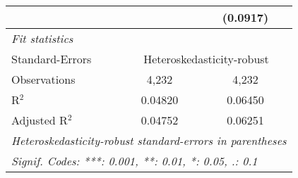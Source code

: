 \begin{tabular}{lcc}
                                         &                 & (0.0917)\\   
   \midrule
   \emph{Fit statistics}\\
   Standard-Errors & \multicolumn{2}{c}{Heteroskedasticity-robust} \\ 
   Observations                          & 4,232           & 4,232\\  
   R$^2$                                 & 0.04820         & 0.06450\\  
   Adjusted R$^2$                        & 0.04752         & 0.06251\\  
   \midrule \midrule
   \multicolumn{3}{l}{\emph{Heteroskedasticity-robust standard-errors in parentheses}}\\
   \multicolumn{3}{l}{\emph{Signif. Codes: ***: 0.001, **: 0.01, *: 0.05, .: 0.1}}\\
\end{tabular}
\par\endgroup


